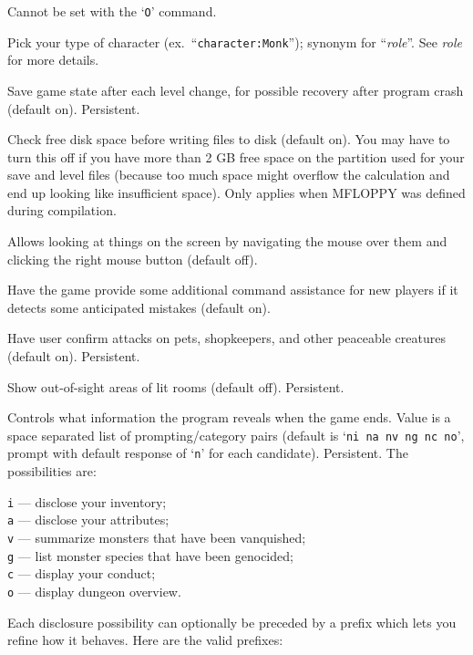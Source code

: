 Cannot be set with the `{\tt O}' command.
\item[\ib{character}]
Pick your type of character (ex.\ ``{\tt character:Monk}'');
synonym for ``{\it role\/}''.  See {\it role\/} for more details.
\item[\ib{checkpoint}]
Save game state after each level change, for possible recovery after
program crash (default on).  Persistent.
\item[\ib{checkspace}]
Check free disk space before writing files to disk (default on).
You may have to turn this off if you have more than 2 GB free space
on the partition used for your save and level files
(because too much space might overflow the calculation and end up
looking like insufficient space).
Only applies when MFLOPPY was defined during compilation.
\item[\ib{clicklook}]
Allows looking at things on the screen by navigating the mouse
over them and clicking the right mouse button (default off).
\item[\ib{cmdassist}]
Have the game provide some additional command assistance for new 
players if it detects some anticipated mistakes (default on).
\item[\ib{confirm}]
Have user confirm attacks on pets, shopkeepers, and other
peaceable creatures (default on).  Persistent.
\item[\ib{dark\verb+_+room}]
Show out-of-sight areas of lit rooms (default off).  Persistent.
\item[\ib{disclose}]
Controls what information the program reveals when the game ends.
Value is a space separated list of prompting/category pairs
(default is `{\tt ni na nv ng nc no}',
prompt with default response of `{\tt n}' for each candidate).
Persistent.
The possibilities are:

{\tt i} --- disclose your inventory;\\
{\tt a} --- disclose your attributes;\\
{\tt v} --- summarize monsters that have been vanquished;\\
{\tt g} --- list monster species that have been genocided;\\
{\tt c} --- display your conduct;\\
{\tt o} --- display dungeon overview.

Each disclosure possibility can optionally be preceded by a prefix which
lets you refine how it behaves.  Here are the valid prefixes:

